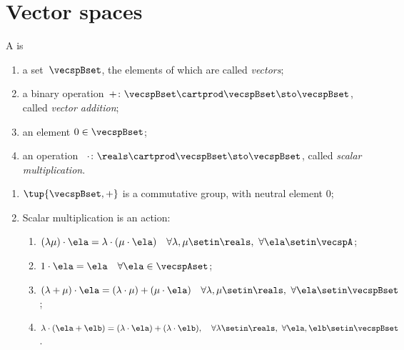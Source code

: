 
\section{Vector spaces}
\label{sec:vector-spaces}



\begin{ctdefinition}
    \label{def:real-vector-space}
    A  is
    \begin{body}
        \constit
        \begin{enumerate}
            \item a set~$\vecspBset$, the elements of which are called \emph{vectors};
            \item a binary operation~$+ \colon \vecspBset \cartprod \vecspBset \sto \vecspBset$, called \emph{vector addition};
            \item an element $0 \in \vecspBset$;
            \item an operation ~$\cdot \colon \reals \cartprod \vecspBset \sto \vecspBset$, called \emph{scalar multiplication}.
        \end{enumerate}
        \condit
        \begin{enumerate}
            \item $\tup{\vecspBset, +}$ is a commutative group, with neutral element $0$;
            \item Scalar multiplication is an action:
                  \begin{enumerate}
                      \item $(\lambda \mu) \cdot \ela = \lambda \cdot( \mu \cdot \ela) \quad \forall \lambda, \mu \setin \reals, \ \forall \ela \setin \vecspA$;
                      \item $1 \cdot \ela = \ela \quad \forall \ela \in \vecspAset$;
                      \item $(\lambda + \mu) \cdot \ela = (\lambda \cdot \mu) + (\mu \cdot \ela) \quad \forall \lambda, \mu \setin \reals, \ \forall \ela \setin \vecspBset$;
                      \item $\lambda \cdot (\ela + \elb) = (\lambda \cdot \ela) + (\lambda \cdot \elb), \quad \forall \lambda \setin \reals, \ \forall \ela, \elb \setin \vecspBset$.
                  \end{enumerate}
        \end{enumerate}
    \end{body}
\end{ctdefinition}

